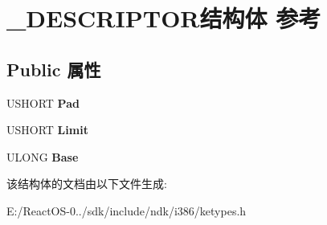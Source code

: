 \hypertarget{struct___d_e_s_c_r_i_p_t_o_r}{}\section{\+\_\+\+D\+E\+S\+C\+R\+I\+P\+T\+O\+R结构体 参考}
\label{struct___d_e_s_c_r_i_p_t_o_r}
\subsection*{Public 属性}
\begin{DoxyCompactItemize}
\item 
\mbox{\label{struct___d_e_s_c_r_i_p_t_o_r_a05a8797797f13e63202c07a63d6302e8}} 
U\+S\+H\+O\+RT {\bfseries Pad}
\item 
\mbox{\label{struct___d_e_s_c_r_i_p_t_o_r_af570cefe46d33f7e195ac40ae66774b4}} 
U\+S\+H\+O\+RT {\bfseries Limit}
\item 
\mbox{\label{struct___d_e_s_c_r_i_p_t_o_r_a69a12e5c79d3ae3566bde2c65736a60f}} 
U\+L\+O\+NG {\bfseries Base}
\end{DoxyCompactItemize}


该结构体的文档由以下文件生成\+:\begin{DoxyCompactItemize}
\item 
E\+:/\+React\+O\+S-\/0../sdk/include/ndk/i386/ketypes.\+h\end{DoxyCompactItemize}
